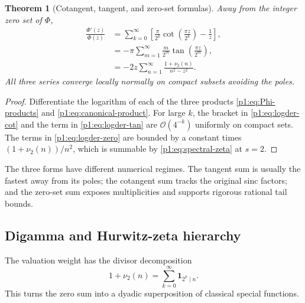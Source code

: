 \documentclass[11pt]{article}
\newtheorem{theorem}{Theorem}[section]
\theoremstyle{definition}
\theoremstyle{remark}
\newcommand{\bigO}{\mathcal O}
\newcommand{\one}{\mathbf 1}
\begin{document}
\begin{theorem}[Cotangent, tangent, and zero-set formulas]\label{p1:thm:three-logder}
Away from the integer zero set of \(\Phi\),
\begin{align}
 \frac{\Phi'(z)}{\Phi(z)}
 &=\sum_{k=0}^{\infty}
 \left[
 \frac{\pi}{2^k}\cot\!\left(\frac{\pi z}{2^k}\right)-\frac1z
 \right],                                                    \label{p1:eq:logder-cot}\\
 &=-\pi\sum_{m=1}^{\infty}\frac{m}{2^m}
 \tan\!\left(\frac{\pi z}{2^m}\right),                    \label{p1:eq:logder-tan}\\
 &=-2z\sum_{n=1}^{\infty}\frac{1+\nu_2(n)}{n^2-z^2}.       \label{p1:eq:logder-zero}
\end{align}
All three series converge locally normally on compact subsets avoiding the poles.
\end{theorem}

\begin{proof}
Differentiate the logarithm of each of the three products
\eqref{p1:eq:Phi-products} and \eqref{p1:eq:canonical-product}.  For large \(k\), the bracket
in \eqref{p1:eq:logder-cot} and the term in \eqref{p1:eq:logder-tan} are \(\bigO(4^{-k})\)
uniformly on compact sets.  The terms in \eqref{p1:eq:logder-zero} are bounded by a constant
times \((1+\nu_2(n))/n^2\), which is summable by \eqref{p1:eq:spectral-zeta} at \(s=2\).
\end{proof}

The three forms have different numerical regimes.  The tangent sum is usually the fastest
away from its poles; the cotangent sum tracks the original sinc factors; and the zero-set
sum exposes multiplicities and supports rigorous rational tail bounds.

\subsection{Digamma and Hurwitz-zeta hierarchy}

The valuation weight has the divisor decomposition
\begin{equation}
 1+\nu_2(n)=\sum_{k=0}^{\infty}\one_{2^k\mid n}.             \label{p1:eq:valuation-indicators}
\end{equation}
This turns the zero sum into a dyadic superposition of classical special functions.
\end{document}
